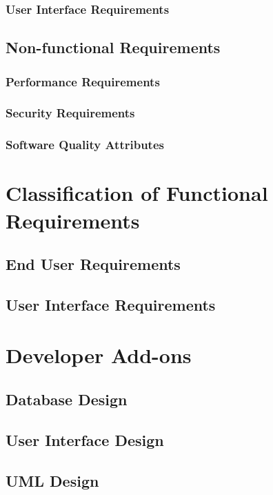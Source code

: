 \documentclass[openany, oneside,11pt]{book}
\begin{document}
\subsection{User Interface Requirements}

\section{Non-functional Requirements}
\subsection{Performance Requirements}
\subsection{Security Requirements}
\subsection{Software Quality Attributes}

\chapter{Classification of Functional Requirements}
\section{End User Requirements}
\section{User Interface Requirements}

\chapter{Developer Add-ons}
\section{Database Design}
\section{User Interface Design}
\section{UML Design}

\appendix
\end{document}
